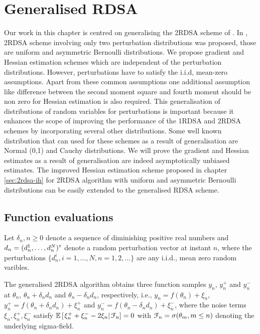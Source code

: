 \chapter{Generalised RDSA }
\label{sec:2rdsa-gen}
Our work in this chapter  is centred on generalising the 2RDSA scheme of \cite{prashanth2015rdsa}. In \cite{prashanth2015rdsa}, 2RDSA scheme involving only two perturbation distributions was proposed, those are uniform and asymmetric Bernoulli distributions. We propose gradient and Hessian estimation schemes which are independent of the perturbation distributions. However, perturbations have to satisfy the i.i.d, mean-zero assumptions. Apart from these common assumptions  one additional assumption like difference between the second moment square  and fourth moment should be non zero for Hessian estimation is also required. This generalisation of distributions of random variables for perturbations is important because it enhances the scope of improving the performance of the 1RDSA and 2RDSA schemes by incorporating several other distributions. Some well known distribution that can used for these schemes as a result of generalisation are Normal (0,1) and Cauchy distributions. We will prove the  gradient and Hessian estimates as a result of generalisation are indeed asymptotically unbiased estimates.
 The improved Hessian estimation scheme proposed in chapter \ref{sec:2rdsa-ih} for 2RDSA algorithm with uniform and asymmetric Bernoulli distributions can be easily extended to the generalised RDSA scheme.

\section{Function evaluations}
Let $\delta_n, n\geq 0$ denote a sequence of diminishing positive real numbers and $d_n = (d_n^1,\ldots,d_n^N)^\mathsf{\scriptscriptstyle T}$ denote a random perturbation vector at instant $n$,
where the perturbations $\{d_n^i, i=1,\ldots,N, n=1,2,\ldots\}$ are any i.i.d., mean zero random varibles. 

The generalised 2RDSA algorithm obtains three function samples $y_n$, $y_n^+$ and $y_n^-$ at $\theta_n$, $\theta_n+\delta_n d_n$ and $\theta_n - \delta_n d_n$, respectively, i.e.,
$y_n = f(\theta_n) + \xi_n$, $y_n^+ = f(\theta_n+\delta_n d_n) + \xi_n^+$ and 
$y_n^- = f(\theta_n-\delta_n d_n) + \xi_n^-$,
where the noise terms $\xi_n, \xi_n^+, \xi_n^-$ satisfy $\mathbb{E}\left[\left.\xi_n^+ + \xi_n^- - 2\xi_n \right| \mathcal{F}_n\right] = 0$ with $\mathcal{F}_n = \sigma(\theta_m,m\le n)$ denoting the underlying sigma-field. 


